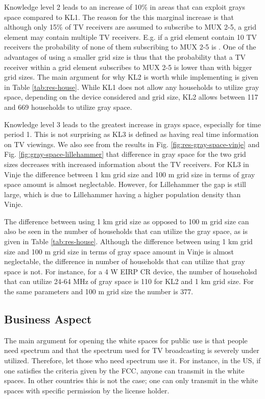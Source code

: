 \documentclass[journal,11pt,draftclsnofoot,onecolumn]{IEEEtran}
\begin{document}
Knowledge level 2 leads to an increase of 10\% in areas that can exploit grays space compared to KL1. The reason for the this marginal increase is that although only 15\% of TV receivers are assumed to subscribe to MUX 2-5, a grid element may contain multiple TV receivers. E.g. if a grid element contain 10 TV receivers the probability of none of them subscribing to MUX 2-5 is . One of the advantages of using a smaller grid size is thus that the probability that a TV receiver within a grid element subscribes to MUX 2-5 is lower than with bigger grid sizes. The main argument for why KL2 is worth while implementing is given in Table \ref{tab:res-house}. While KL1 does not allow any households to utilize gray space, depending on the device considered and grid size, KL2 allows between 117 and 669 households to utilize gray space.

Knowledge level 3 leads to the greatest increase in grays space, especially for time period 1. This is not surprising as KL3 is defined as having real time information on TV viewings. We also see from the results in Fig. \ref{fig:res-gray-space-vinje} and Fig. \ref{fig:gray-space-lillehammer} that difference in gray space for the two grid sizes decreases with increased information about the TV receivers. For KL3 in Vinje the difference between 1 km grid size and 100 m grid size in terms of gray space amount is almost neglectable. However, for Lillehammer the gap is still large, which is due to Lillehammer having a higher population density than Vinje.

The difference between using 1 km grid size as opposed to 100 m grid size can also be seen in the number of households that can utilize the gray space, as is given in Table \ref{tab:res-house}. Although the difference between using 1 km grid size and 100 m grid size in terms of gray space amount in Vinje is almost neglectable, the difference in number of households that can utilize that gray space is not. For instance, for a 4 W EIRP CR device, the number of householsd that can utilize 24-64 MHz of gray space is 110 for KL2 and 1 km grid size. For the same parameters and 100 m grid size the number is 377.

\subsection{Business Aspect}
The main argument for opening the white spaces for public use is that people need spectrum and that the spectrum used for TV broadcasting is severely under utilized. Therefore, let those who need spectrum use it. For instance, in the US, if one satisfies the criteria given by the FCC, anyone can transmit in the white spaces. In other countries this is not the case; one can only transmit in the white spaces with specific permission by the license holder.
\end{document}
